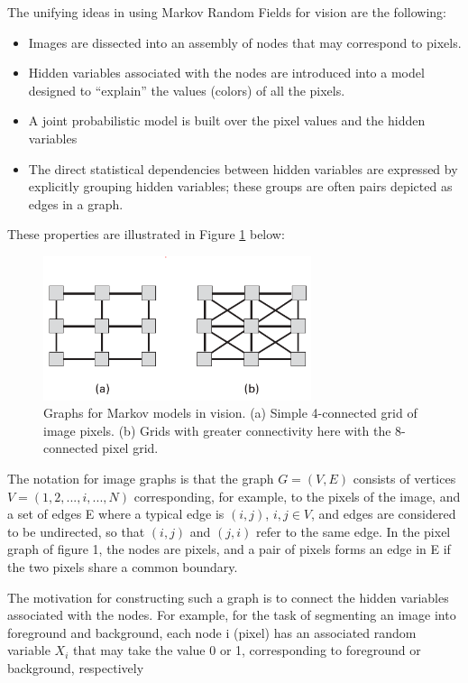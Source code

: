 The unifying ideas in using Markov Random Fields for vision are the following:
\begin{itemize}
	\item Images are dissected into an assembly of nodes that may correspond to pixels.
	\item Hidden variables associated with the nodes are introduced into a model designed to “explain” the values (colors) of all the pixels.
	\item  A joint probabilistic model is built over the pixel values and the hidden variables
	\item The direct statistical dependencies between hidden  variables are expressed by explicitly grouping hidden variables; these groups are often pairs depicted as edges in a graph.
\end{itemize}
These properties are illustrated in Figure \ref{fig:connectivity} below:
\begin{figure}[H]
	\centering
	\includegraphics[width=0.7\textwidth]{fig/Connectivity.PNG}
	\caption{Graphs for Markov models in vision. (a) Simple 4-connected grid of image pixels. (b) Grids with greater connectivity
		here with the 8-connected pixel grid.}
	\label{fig:connectivity}
\end{figure}
The notation for image graphs is that the graph $G = (V, E)$ consists of vertices $V =(1, 2, . . . , i, . . . , N)$ corresponding, for example, to the pixels of the image, and a set of edges E where a typical edge is $(i, j)$, $i, j \in V$, and edges are considered to be undirected, so that $(i, j)$ and $(j, i)$ refer to the same edge. In the pixel graph of figure 1, the nodes are pixels, and a pair of pixels forms an edge in E if the two pixels share a common boundary.

The motivation for constructing such a graph is to connect the hidden variables associated with the nodes. For example, for the task of segmenting an image into foreground and background, each node i (pixel) has an associated random variable $X_i$ that may take the value 0 or 1, corresponding to foreground or background, respectively


